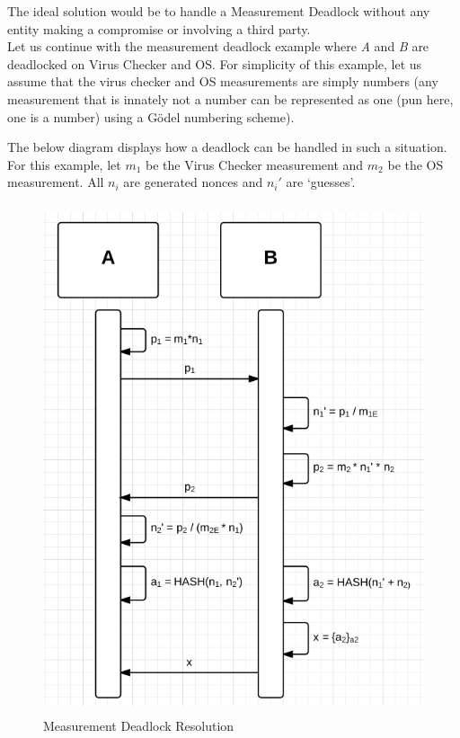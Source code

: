 \documentclass[10pt,a4paper,tikz]{article}
\begin{document}
The ideal solution would be to handle a Measurement Deadlock without any entity making a compromise or involving a third party. \\

Let us continue with the measurement deadlock example where \textit{A} and \textit{B} are deadlocked on Virus Checker and OS. For simplicity of this example, let us assume that the virus checker and OS measurements are simply numbers (any measurement that is innately not a number can be represented as one (pun here, one is a number) using a G\"odel numbering scheme).

The below diagram displays how a deadlock can be handled in such a situation. For this example, let 
$m_1$ be the Virus Checker measurement and $m_2$ be the OS measurement. All $n_i $ are generated nonces and $n_i'$ are `guesses'. 

\begin{figure}[]
\centering
\includegraphics[height=150mm]{MeasurementDeadlockResolution.png}
\caption{Measurement Deadlock Resolution \label{overflow}}
\end{figure}
\end{document}
